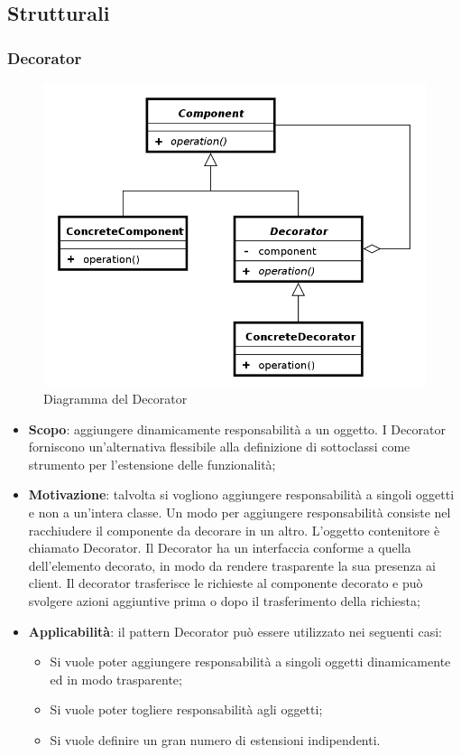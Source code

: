 	\subsection{ Strutturali}

		\subsubsection{Decorator}
		\begin{figure}[H]
		\centering
		\includegraphics[width=0.5\linewidth]{GraficiAppendici/decorator.png}
		\caption{Diagramma del  Decorator}
	\end{figure}
	\begin{itemize}
	\item \textbf{Scopo}: aggiungere dinamicamente responsabilità a un oggetto. I Decorator forniscono
un’alternativa flessibile alla definizione di sottoclassi come strumento per l’estensione delle funzionalità;
	\item \textbf{Motivazione}: talvolta si vogliono aggiungere responsabilità a singoli oggetti e
non a un’intera classe. Un modo per aggiungere responsabilità consiste nel racchiudere il componente da
decorare in un altro. L’oggetto contenitore è chiamato Decorator. Il Decorator ha un interfaccia conforme a quella dell’elemento decorato, in modo da rendere trasparente la sua presenza ai client. Il decorator trasferisce le richieste al componente decorato e può svolgere azioni aggiuntive prima o dopo il trasferimento della richiesta;
	\item \textbf{Applicabilità}: il pattern Decorator può essere utilizzato nei seguenti casi:
	\begin{itemize}
	\item Si vuole poter aggiungere responsabilità a singoli oggetti dinamicamente ed in modo trasparente;
	\item Si vuole poter togliere responsabilità agli oggetti;
	\item Si vuole definire un gran numero di estensioni indipendenti.
	\end{itemize}
\end{itemize}			
		
